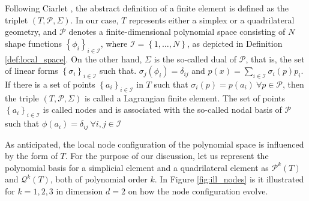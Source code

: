 \documentclass[11pt]{article}
\theoremstyle{remark}
\numberwithin{equation}{section}
\begin{document}
Following Ciarlet \cite[pp.93]{ciarlet1991basic}, the abstract definition of a finite element is defined as the triplet $( T, \mathcal{P}, \Sigma ) $.
In our case, $T$ represents either a simplex or a quadrilateral geometry, and $\mathcal{P}$ denotes a finite-dimensional polynomial space consisting of $N$ shape functions $\left\{ \phi_{i} \right\}_{i\in \mathcal{I} } $, where $\mathcal{I} = \left\{
1, \ldots, N \right\} $, as depicted in Definition \ref{def:local_space}.
On the other hand, $\Sigma $ is the so-called dual of $\mathcal{P}$, that is, the set of linear forms $\left\{ \sigma _{i} \right\}_{i \in \mathcal{I} } $ such that. $ \sigma_{j} ( \phi_{i} ) = \delta _{ij}$ and $p( x) = \sum_{i\in \mathcal{I} }^{} \sigma_{i} ( p) p_{i} $.
If there is a set of points $\left\{ a_{i} \right\}_{i \in \mathcal{I} } $  in $T$ such that
$\sigma_{i}( p) = p( a_{i}) \  \forall p \in \mathcal{P}$,  then the triple $( T, \mathcal{P}, \Sigma  ) $ is called a Lagrangian finite element. The set of points $\left\{ a_{i} \right\}_{i \in \mathcal{I} }  $ is called nodes and is associated with the
so-called nodal basis of $\mathcal{P} $ such that  $\phi ( a_{i}) = \delta _{ij} \ \forall i,j  \in \mathcal{I} $

As anticipated, the local node configuration of the polynomial space is influenced by the form of $T$. For the purpose of our discussion, let us represent the polynomial basis for a simplicial element and a quadrilateral
element as $\mathcal{P} ^{k}(T )$ and $\mathcal{Q} ^{k}( T)$, both of polynomial order $k$. In Figure \ref{fig:ill_nodes} is it illustrated for  $k=1,2,3$ in dimension $d=2$ on how the node configuration evolve.
\end{document}
